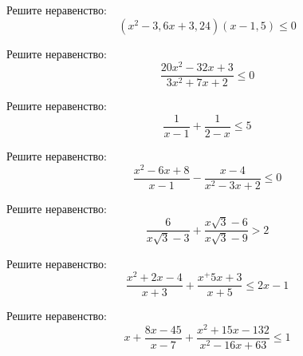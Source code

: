 \begin{class}[number=3]
	\begin{listofex}
		
		
		
		
		\item Решите неравенство: %
		\[ (x^2-3,6x+3,24)(x-1,5) \le 0 \]
		
		\item Решите неравенство: %
		\[ \dfrac{20x^2-32x+3}{3x^2+7x+2} \le 0 \]
		
		\item Решите неравенство: %
		\[ \dfrac{1}{x-1}+\dfrac{1}{2-x} \le 5 \]
		
		\item Решите неравенство: %
		\[ \dfrac{x^2-6x+8}{x-1}-\dfrac{x-4}{x^2-3x+2} \le 0 \]
		
		\item Решите неравенство: %
		\[ \dfrac{6}{x\sqrt{3}-3}+\dfrac{x\sqrt{3}-6}{x\sqrt{3}-9} > 2 \]
		
		\item Решите неравенство: %
		\[ \dfrac{x^2 + 2x -4}{x+3}+\dfrac{x^+5x+3}{x+5} \le 2x-1 \]
		
		\item Решите неравенство: %
		\[ x+ \dfrac{8x-45}{x-7}+\dfrac{x^2+15x-132}{x^2-16x+63} \le 1 \]
		
		
	\end{listofex}
\end{class}

